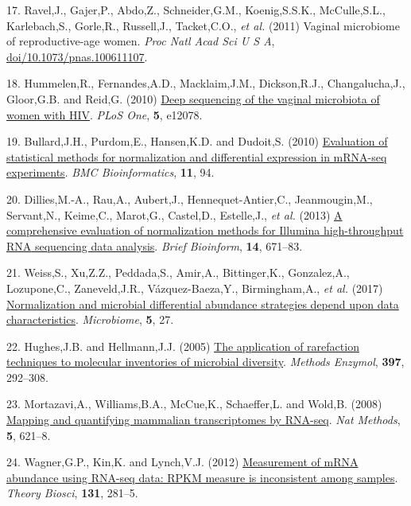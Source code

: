 \documentclass[
]{article}
\newlength{\cslhangindent}
\newenvironment{CSLReferences}[2] %
 {\begin{list}{}{%
  \setlength{\itemindent}{0pt}
  \setlength{\leftmargin}{0pt}
  \setlength{\parsep}{0pt}
  \ifodd #1
   \setlength{\leftmargin}{\cslhangindent}
   \setlength{\itemindent}{-1\cslhangindent}
  \fi
  \setlength{\itemsep}{#2\baselineskip}}}
 {\end{list}}
\begin{document}
\begin{CSLReferences}{1}{1}
17. Ravel,J., Gajer,P., Abdo,Z., Schneider,G.M., Koenig,S.S.K.,
McCulle,S.L., Karlebach,S., Gorle,R., Russell,J., Tacket,C.O., \emph{et
al.} (2011) Vaginal microbiome of reproductive-age women. \emph{Proc
Natl Acad Sci U S A},
\href{https://doi.org/doi/10.1073/pnas.100611107}{doi/10.1073/pnas.100611107}.

18. Hummelen,R., Fernandes,A.D., Macklaim,J.M., Dickson,R.J.,
Changalucha,J., Gloor,G.B. and Reid,G. (2010)
\href{https://doi.org/10.1371/journal.pone.0012078}{Deep sequencing of
the vaginal microbiota of women with {HIV}}. \emph{PLoS One},
\textbf{5}, e12078.

19. Bullard,J.H., Purdom,E., Hansen,K.D. and Dudoit,S. (2010)
\href{https://doi.org/10.1186/1471-2105-11-94}{Evaluation of statistical
methods for normalization and differential expression in m{RNA-seq}
experiments}. \emph{BMC Bioinformatics}, \textbf{11}, 94.

20. Dillies,M.-A., Rau,A., Aubert,J., Hennequet-Antier,C.,
Jeanmougin,M., Servant,N., Keime,C., Marot,G., Castel,D., Estelle,J.,
\emph{et al.} (2013) \href{https://doi.org/10.1093/bib/bbs046}{A
comprehensive evaluation of normalization methods for {Illumina}
high-throughput {RNA} sequencing data analysis}. \emph{Brief Bioinform},
\textbf{14}, 671--83.

21. Weiss,S., Xu,Z.Z., Peddada,S., Amir,A., Bittinger,K., Gonzalez,A.,
Lozupone,C., Zaneveld,J.R., Vázquez-Baeza,Y., Birmingham,A., \emph{et
al.} (2017)
\href{https://doi.org/10.1186/s40168-017-0237-y}{Normalization and
microbial differential abundance strategies depend upon data
characteristics}. \emph{Microbiome}, \textbf{5}, 27.

22. Hughes,J.B. and Hellmann,J.J. (2005)
\href{https://doi.org/10.1016/S0076-6879(05)97017-1}{The application of
rarefaction techniques to molecular inventories of microbial diversity}.
\emph{Methods Enzymol}, \textbf{397}, 292--308.

23. Mortazavi,A., Williams,B.A., McCue,K., Schaeffer,L. and Wold,B.
(2008) \href{https://doi.org/10.1038/nmeth.1226}{Mapping and quantifying
mammalian transcriptomes by {RNA-seq}}. \emph{Nat Methods}, \textbf{5},
621--8.

24. Wagner,G.P., Kin,K. and Lynch,V.J. (2012)
\href{https://doi.org/10.1007/s12064-012-0162-3}{Measurement of mRNA
abundance using RNA-seq data: RPKM measure is inconsistent among
samples}. \emph{Theory Biosci}, \textbf{131}, 281--5.


\end{CSLReferences}
\end{document}

